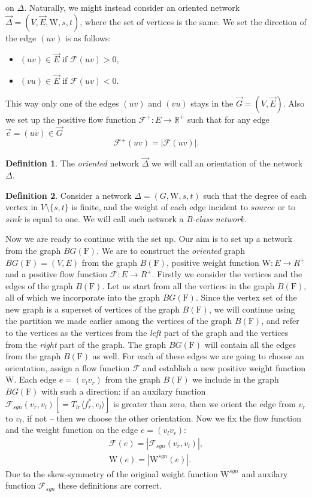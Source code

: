 \documentclass[12pt]{article}
\theoremstyle{definition}
\newtheorem{definition}{Definition}
\newcommand{\fsys}{\mathrm{F}}
\newcommand{\sgnwt}{\mathrm{W}^{sgn}}
\newcommand{\wt}{\mathrm{W}}
\newcommand{\flow}{\mathcal{F}}
\newcommand{\flowpos}{\mathcal{F^+}}
\newcommand{\flowsgn}{\mathcal{F}_{sgn}}
\newcommand{\source}{\mathit{source}}
\newcommand{\sink}{\mathit{sink}}
\newcommand{\net}{\Delta}
\newcommand{\onet}{\vec{\Delta}}
\numberwithin{remark}{section}
\numberwithin{theorem}{section}
\numberwithin{prop}{section}
\numberwithin{equation}{section}
\numberwithin{lemma}{section}
\numberwithin{prop_under_lemma}{lemma}
\begin{document}
    on $\net$.
    Naturally, we might instead consider an oriented network $\onet = (V, \vec{E}, \wt, s, t)$, where
    the set of vertices is the same.
    We set the direction of the edge $(uv)$ is as follows:
    \begin{itemize}
      \item $(uv) \in \vec{E}$ if $\flow(uv) > 0$,
      \item $(vu) \in \vec{E}$ if $\flow(uv) < 0$.
    \end{itemize}
    This way only one of the edges $(uv)$ and $(vu)$ stays in the $\vec{G} = (V, \vec{E})$.
    Also we set up the positive flow function $\flowpos: E \to \mathbb{R}^+$ such that 
    for any edge $\vec{e} = (uv) \in \vec{G}$
    $$
      \flowpos(uv) = |\flow(uv)|.
    $$
    \begin{definition}
      The \emph{oriented} network $\onet$ we will call an orientation of the network $\net$.
    \end{definition}
    \begin{definition}
      Consider a network $\net = (G, \wt, s, t)$ such that
      the degree of each vertex in $V \setminus \{s, t\} $ is finite,
      and the weight of each edge incident to $\source$ or to $\sink$ is equal to one.
      We will call such network a \it{B-class network}.
    \end{definition}
    
    Now we are ready to continue with the set up.
    Our aim is to set up a network from the graph $BG(\fsys)$.
    We are to construct the \emph{oriented} graph $BG(\fsys) = (V, E)$ from the graph $B(\fsys)$,
    positive weight function $\wt: E \to R^{+}$ and a positive flow function
    $\flow: E \to R^{+}$.
    Firstly we consider the vertices and the edges of the graph $B(\fsys)$.
    Let us start from all the vertices in the graph $B(\fsys)$,
    all of which we incorporate into the graph $BG(\fsys)$.
    Since the vertex set of the new graph is a superset of vertices of the graph $B(\fsys)$,
    we will continue using the partition we made earlier among the vertices of the graph $B(\fsys)$, and
    refer to the vertices as the vertices from the \textit{left} part of the graph and the vertices from the 
    \textit{right} part of the graph.
    The graph $BG(\fsys)$ will contain all the edges from the graph $B(\fsys)$ as well.
    For each of these edges we are going to choose an orientation, assign a flow function $\flow$ and
    establish a new positive weight function $\wt$.
    Each edge $e = (v_l v_r)$ from the graph $B(\fsys)$ we include in the graph $BG(\fsys)$ with such a direction:
    if an auxilary function $\flowsgn(v_r, v_l) [= T_{lr} \langle f^*_r, e_l \rangle]$ is greater than zero, then
    we orient the edge from $v_r$ to $v_l$, if not -- then we choose the other orientation.
    Now we fix the flow function and the weight function on the edge $e = (v_l v_r)$:
    \begin{align*}
      \flow(e) = \left| \flowsgn(v_r, v_l) \right|,\\
      \wt(e) = \left| \sgnwt(e)\right|.
    \end{align*}
    Due to the skew-symmetry of the original weight function $\sgnwt$ and auxilary function $\flowsgn$
    these definitions are correct.
    
\end{document}
